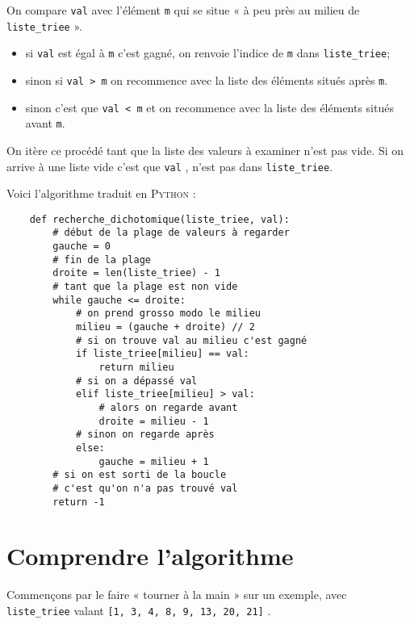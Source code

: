 \begin{methode}[]
	On compare \texttt{val} avec l'élément \texttt{m} qui se situe « à peu près au milieu de \texttt{liste_triee} ».
	\begin{itemize}
		\item 	si \texttt{val} est égal à \texttt{m} c'est gagné, on renvoie l'indice de \texttt{m} dans  \texttt{liste_triee};
		\item 	sinon si \texttt{val > m} on recommence avec la liste des éléments situés après \texttt{m}.
		\item 	sinon c'est que \texttt{val < m} et on recommence avec la liste des éléments situés avant \texttt{m}.
	\end{itemize}
	On itère ce procédé tant que la liste des valeurs à examiner n'est pas vide. Si on arrive à une liste vide c'est que \texttt{val} , n'est pas dans \texttt{liste_triee}.
\end{methode}
Voici l'algorithme traduit en \textsc{Python} :
\begin{pyc}
	\begin{verbatim}
	def recherche_dichotomique(liste_triee, val):
		# début de la plage de valeurs à regarder
		gauche = 0  
		# fin de la plage
		droite = len(liste_triee) - 1
		# tant que la plage est non vide  
		while gauche <= droite:  
			# on prend grosso modo le milieu
			milieu = (gauche + droite) // 2  
			# si on trouve val au milieu c'est gagné
			if liste_triee[milieu] == val:
				return milieu  
			# si on a dépassé val
			elif liste_triee[milieu] > val:  
				# alors on regarde avant
				droite = milieu - 1  
			# sinon on regarde après
			else:
				gauche = milieu + 1  
		# si on est sorti de la boucle
		# c'est qu'on n'a pas trouvé val
		return -1  
	\end{verbatim}
\end{pyc}

\section{Comprendre l'algorithme}

Commençons par le faire « tourner à la main » sur un exemple, avec\\ \texttt{liste_triee} valant \texttt{[1, 3, 4, 8, 9, 13, 20, 21]} .\\

